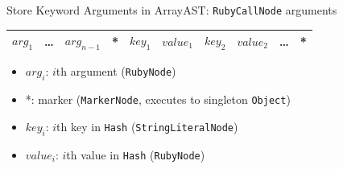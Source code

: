 \documentclass[xcolor=dvipsname,handout]{beamer} %
\begin{document}
\begin{frame}{Store Keyword Arguments in Array}{AST: \lstinline{RubyCallNode} arguments}
\begin{table}
\begin{tabular}{|c|c|c|c|c|c|c|c|c|c|}
\hline
$\mathit{arg}_1$ & \ldots & $\mathit{arg}_{n-1}$ & * & $\mathit{key}_1$ & $\mathit{value}_1$ & $\mathit{key}_2$ & $\mathit{value}_2$ & \ldots & * \\
\hline
\end{tabular}
\end{table}
\begin{itemize}
    \item $\mathit{arg}_i$: $i$th argument (\lstinline{RubyNode})
    \item *: marker (\lstinline{MarkerNode}, executes to singleton \lstinline{Object})
    \item $\mathit{key}_i$: $i$th key in \lstinline{Hash} (\lstinline{StringLiteralNode})
    \item $\mathit{value}_i$: $i$th value in \lstinline{Hash} (\lstinline{RubyNode})
\end{itemize}
\end{frame}


%
\end{document}
